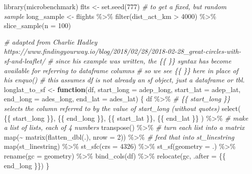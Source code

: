 \documentclass[
]{book}
\newenvironment{Shaded}{\begin{snugshade}}{\end{snugshade}}
\newcommand{\AttributeTok}[1]{\textcolor[rgb]{0.77,0.63,0.00}{#1}}
\newcommand{\CommentTok}[1]{\textcolor[rgb]{0.56,0.35,0.01}{\textit{#1}}}
\newcommand{\ControlFlowTok}[1]{\textcolor[rgb]{0.13,0.29,0.53}{\textbf{#1}}}
\newcommand{\DecValTok}[1]{\textcolor[rgb]{0.00,0.00,0.81}{#1}}
\newcommand{\FunctionTok}[1]{\textcolor[rgb]{0.00,0.00,0.00}{#1}}
\newcommand{\NormalTok}[1]{#1}
\newcommand{\OtherTok}[1]{\textcolor[rgb]{0.56,0.35,0.01}{#1}}
\newcommand{\SpecialCharTok}[1]{\textcolor[rgb]{0.00,0.00,0.00}{#1}}
\begin{document}
\begin{Shaded}
\begin{Highlighting}[]
\FunctionTok{library}\NormalTok{(microbenchmark)}
\NormalTok{flts }\OtherTok{\textless{}{-}} \FunctionTok{set.seed}\NormalTok{(}\DecValTok{777}\NormalTok{) }\CommentTok{\# to get a fixed, but random sample}
\NormalTok{long\_sample }\OtherTok{\textless{}{-}}\NormalTok{ flights }\SpecialCharTok{\%\textgreater{}\%} 
  \FunctionTok{filter}\NormalTok{(dist\_act\_km }\SpecialCharTok{\textgreater{}} \DecValTok{4000}\NormalTok{) }\SpecialCharTok{\%\textgreater{}\%} 
  \FunctionTok{slice\_sample}\NormalTok{(}\AttributeTok{n =} \DecValTok{100}\NormalTok{) }

\CommentTok{\# adapted from Charlie Hadley https://www.findingyourway.io/blog/2018/02/28/2018{-}02{-}28\_great{-}circles{-}with{-}sf{-}and{-}leaflet/}
\CommentTok{\# since his example was written, the \{\{ \}\} syntax has become available for referring to dataframe columns}
\CommentTok{\# so we see \{\{ \}\} here in place of his \textasciigrave{}enquo()\textasciigrave{}}
\CommentTok{\# this assumes df is not already an \textasciigrave{}sf\textasciigrave{} object, just a dataframe or tbl.}
\NormalTok{longlat\_to\_sf }\OtherTok{\textless{}{-}} \ControlFlowTok{function}\NormalTok{(df,}
                           \AttributeTok{start\_long =}\NormalTok{ adep\_long,}
                           \AttributeTok{start\_lat =}\NormalTok{ adep\_lat,}
                           \AttributeTok{end\_long =}\NormalTok{ ades\_long,}
                           \AttributeTok{end\_lat =}\NormalTok{ ades\_lat) \{}
\NormalTok{  df }\SpecialCharTok{\%\textgreater{}\%}
    \CommentTok{\# \{\{ start\_long \}\} selects the column referred to by the value of start\_long (without quotes)}
    \FunctionTok{select}\NormalTok{(}
\NormalTok{      \{\{ start\_long \}\},}
\NormalTok{      \{\{ end\_long \}\},}
\NormalTok{      \{\{ start\_lat \}\},}
\NormalTok{      \{\{ end\_lat \}\}}
\NormalTok{    ) }\SpecialCharTok{\%\textgreater{}\%}
    \CommentTok{\# make a list of lists, each of 4 numbers}
    \FunctionTok{transpose}\NormalTok{() }\SpecialCharTok{\%\textgreater{}\%}
    \CommentTok{\# turn each list into a matrix}
    \FunctionTok{map}\NormalTok{(}\SpecialCharTok{\textasciitilde{}} \FunctionTok{matrix}\NormalTok{(}\FunctionTok{flatten\_dbl}\NormalTok{(.), }\AttributeTok{nrow =} \DecValTok{2}\NormalTok{)) }\SpecialCharTok{\%\textgreater{}\%}
    \CommentTok{\# feed that into st\_linestring}
    \FunctionTok{map}\NormalTok{(st\_linestring) }\SpecialCharTok{\%\textgreater{}\%}
    \FunctionTok{st\_sfc}\NormalTok{(}\AttributeTok{crs =} \DecValTok{4326}\NormalTok{) }\SpecialCharTok{\%\textgreater{}\%}
    \FunctionTok{st\_sf}\NormalTok{(}\AttributeTok{geometry =}\NormalTok{ .)  }\SpecialCharTok{\%\textgreater{}\%} 
    \FunctionTok{rename}\NormalTok{(}\AttributeTok{gc =}\NormalTok{ geometry) }\SpecialCharTok{\%\textgreater{}\%}
    \FunctionTok{bind\_cols}\NormalTok{(df) }\SpecialCharTok{\%\textgreater{}\%}
    \FunctionTok{relocate}\NormalTok{(gc, }\AttributeTok{.after =}\NormalTok{ \{\{ end\_long \}\})}
\NormalTok{\}}


\end{Highlighting}
\end{Shaded}
\end{document}
